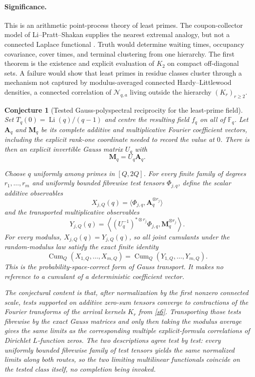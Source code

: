 \documentclass[11pt]{article}
\newtheorem{conjecture}{Conjecture}
\theoremstyle{definition}
\newcommand{\Li}{\operatorname{Li}}
\newcommand{\Fq}{\mathbb F}
\begin{document}
\paragraph{Significance.}
This is an arithmetic point-process theory of least primes.  The coupon-collector model
of Li--Pratt--Shakan supplies the nearest extremal analogy, but not a connected Laplace
functional \cite{LPS}.  Truth would determine waiting times, occupancy covariance,
cover times, and terminal clustering from one hierarchy.  The first theorem is the existence and explicit evaluation of $K_2$ on compact off-diagonal sets. A failure would show that least primes in residue classes cluster through a mechanism not captured by modulus-averaged connected Hardy--Littlewood densities, a connected correlation of $\mathcal N_{q,a}$ living outside the hierarchy $(K_r)_{r\ge2}$.

\begin{conjecture}[Tested Gauss-polyspectral reciprocity for the least-prime field]\label{s7}
Set $T_q(0)=\Li(q)/(q-1)$ and centre the resulting field $f_q$ on all of $\Fq_q$.
Let $\mathbf A_q$ and $\mathbf M_q$ be its complete additive and multiplicative Fourier
coefficient vectors, including the explicit rank-one coordinate needed to record the
value at $0$.  There is then an explicit invertible Gauss matrix $U_q$ with
\[
 \mathbf M_q=U_q\mathbf A_q.
\]

Choose $q$ uniformly among primes in $[Q,2Q]$.  For every finite family of degrees
$r_1,\ldots,r_m$ and uniformly bounded fibrewise test tensors
$\Phi_{j,q}$, define the scalar additive observables
\[
 X_{j,Q}(q)=\langle\Phi_{j,q},\mathbf A_q^{\otimes r_j}\rangle
\]
and the transported multiplicative observables
\[
 Y_{j,Q}(q)=
 \left\langle (U_q^{-1})^{*\otimes r_j}\Phi_{j,q},
               \mathbf M_q^{\otimes r_j}\right\rangle.
\]
For every modulus, $X_{j,Q}(q)=Y_{j,Q}(q)$, so all joint cumulants under the
random-modulus law satisfy the exact finite identity
\[
 \operatorname{Cum}_Q(X_{1,Q},\ldots,X_{m,Q})
 =\operatorname{Cum}_Q(Y_{1,Q},\ldots,Y_{m,Q}).
\]
This is the probability-space-correct form of Gauss transport.  It makes no reference to
a cumulant of a deterministic coefficient vector.

The conjectural content is that, after normalization by the first nonzero connected
scale, tests supported on additive zero-sum tensors converge to contractions of the
Fourier transforms of the arrival kernels $K_r$ from \cref{s6}.  Transporting those
tests fibrewise by the exact Gauss matrices and only then taking the modulus average
gives the same limits as the corresponding multiple explicit-formula correlations of
Dirichlet $L$-function zeros.  The two descriptions agree test by test: every uniformly bounded
fibrewise family of test tensors yields the same normalized limits
along both routes, so the two limiting multilinear functionals
coincide on the tested class itself, no completion being invoked.
\end{conjecture}
\end{document}
